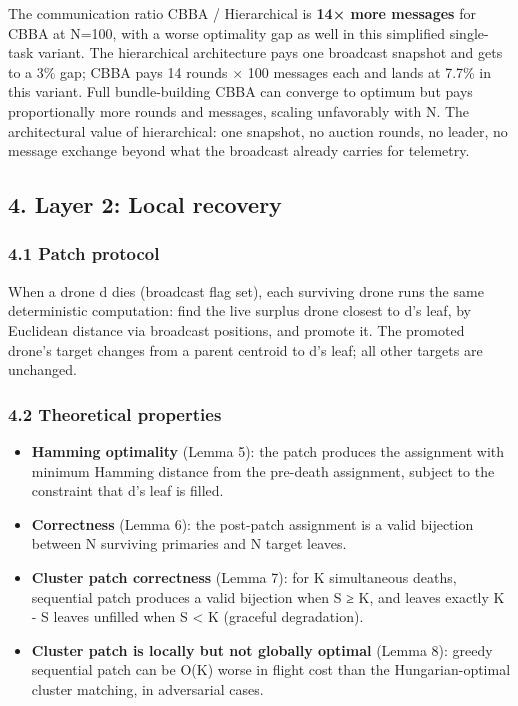 The communication ratio CBBA / Hierarchical is \textbf{14× more
messages} for CBBA at N=100, with a worse optimality gap as well in this
simplified single-task variant. The hierarchical architecture pays one
broadcast snapshot and gets to a 3\% gap; CBBA pays 14 rounds × 100
messages each and lands at 7.7\% in this variant. Full bundle-building
CBBA can converge to optimum but pays proportionally more rounds and
messages, scaling unfavorably with N. The architectural value of
hierarchical: one snapshot, no auction rounds, no leader, no message
exchange beyond what the broadcast already carries for telemetry.

\subsection{4. Layer 2: Local recovery}\label{layer-2-local-recovery}

\subsubsection{4.1 Patch protocol}\label{patch-protocol}

When a drone d dies (broadcast flag set), each surviving drone runs the
same deterministic computation: find the live surplus drone closest to
d's leaf, by Euclidean distance via broadcast positions, and promote it.
The promoted drone's target changes from a parent centroid to d's leaf;
all other targets are unchanged.

\subsubsection{4.2 Theoretical
properties}\label{theoretical-properties-1}

\begin{itemize}
\tightlist
\item
  \textbf{Hamming optimality} (Lemma 5): the patch produces the
  assignment with minimum Hamming distance from the pre-death
  assignment, subject to the constraint that d's leaf is filled.
\item
  \textbf{Correctness} (Lemma 6): the post-patch assignment is a valid
  bijection between N surviving primaries and N target leaves.
\item
  \textbf{Cluster patch correctness} (Lemma 7): for K simultaneous
  deaths, sequential patch produces a valid bijection when S ≥ K, and
  leaves exactly K - S leaves unfilled when S \textless{} K (graceful
  degradation).
\item
  \textbf{Cluster patch is locally but not globally optimal} (Lemma 8):
  greedy sequential patch can be O(K) worse in flight cost than the
  Hungarian-optimal cluster matching, in adversarial cases.
\end{itemize}

